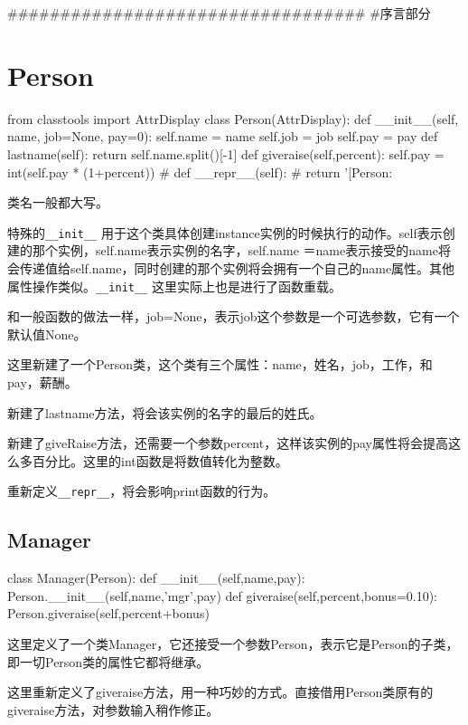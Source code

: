 \documentclass[11pt,oneside]{book}
\begin{document}
\begin{common-format}
\begin{python}
##################################
#序言部分
\end{python}



\section{Person}
\begin{python}
from classtools import AttrDisplay
class Person(AttrDisplay):
    def __init__(self, name, job=None, pay=0):
        self.name = name
        self.job = job
        self.pay = pay
    def lastname(self):
        return self.name.split()[-1]
    def giveraise(self,percent):
        self.pay = int(self.pay * (1+percent))
#    def __repr__(self):
#        return '[Person: %
\end{python}

类名一般都大写。

特殊的\verb+__init__+ 用于这个类具体创建instance实例的时候执行的动作。self表示创建的那个实例，self.name表示实例的名字，self.name ＝name表示接受的name将会传递值给self.name，同时创建的那个实例将会拥有一个自己的name属性。其他属性操作类似。\verb+__init__+ 这里实际上也是进行了函数重载。

和一般函数的做法一样，job=None，表示job这个参数是一个可选参数，它有一个默认值None。

这里新建了一个Person类，这个类有三个属性：name，姓名，job，工作，和pay，薪酬。

新建了lastname方法，将会该实例的名字的最后的姓氏。

新建了giveRaise方法，还需要一个参数percent，这样该实例的pay属性将会提高这么多百分比。这里的int函数是将数值转化为整数。

重新定义\verb+__repr__+，将会影响print函数的行为。


\subsection{Manager}
\begin{python}
class Manager(Person):
    def __init__(self,name,pay):
        Person.__init__(self,name,'mgr',pay)
    def giveraise(self,percent,bonus=0.10):
        Person.giveraise(self,percent+bonus)
\end{python}
这里定义了一个类Manager，它还接受一个参数Person，表示它是Person的子类，即一切Person类的属性它都将继承。

这里重新定义了giveraise方法，用一种巧妙的方式。直接借用Person类原有的giveraise方法，对参数输入稍作修正。


\end{common-format}
\end{document}
